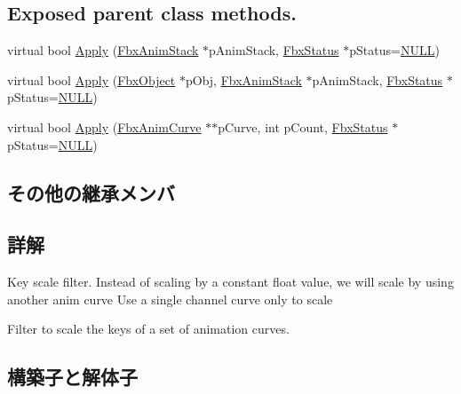 \subsection*{Exposed parent class methods.}
\begin{DoxyCompactItemize}
\item 
virtual bool \hyperlink{class_fbx_anim_curve_filter_scale_by_curve_a6a1c172a82c4e5e2263d388c74ec9dba}{Apply} (\hyperlink{class_fbx_anim_stack}{Fbx\+Anim\+Stack} $\ast$p\+Anim\+Stack, \hyperlink{class_fbx_status}{Fbx\+Status} $\ast$p\+Status=\hyperlink{fbxarch_8h_a070d2ce7b6bb7e5c05602aa8c308d0c4}{N\+U\+LL})
\item 
virtual bool \hyperlink{class_fbx_anim_curve_filter_scale_by_curve_a7212a7c70bb1c0ae8f7c82c25de17745}{Apply} (\hyperlink{class_fbx_object}{Fbx\+Object} $\ast$p\+Obj, \hyperlink{class_fbx_anim_stack}{Fbx\+Anim\+Stack} $\ast$p\+Anim\+Stack, \hyperlink{class_fbx_status}{Fbx\+Status} $\ast$p\+Status=\hyperlink{fbxarch_8h_a070d2ce7b6bb7e5c05602aa8c308d0c4}{N\+U\+LL})
\item 
virtual bool \hyperlink{class_fbx_anim_curve_filter_scale_by_curve_a8fc0bda8ff0cabcd9a424e06ca646581}{Apply} (\hyperlink{class_fbx_anim_curve}{Fbx\+Anim\+Curve} $\ast$$\ast$p\+Curve, int p\+Count, \hyperlink{class_fbx_status}{Fbx\+Status} $\ast$p\+Status=\hyperlink{fbxarch_8h_a070d2ce7b6bb7e5c05602aa8c308d0c4}{N\+U\+LL})
\end{DoxyCompactItemize}
\subsection*{その他の継承メンバ}


\subsection{詳解}
Key scale filter. Instead of scaling by a constant float value, we will scale by using another anim curve Use a single channel curve only to scale

Filter to scale the keys of a set of animation curves. 

\subsection{構築子と解体子}
\mbox{\label{class_fbx_anim_curve_filter_scale_by_curve_a88a350e3639a1fcb3aa29a071fe0fa71}} 
